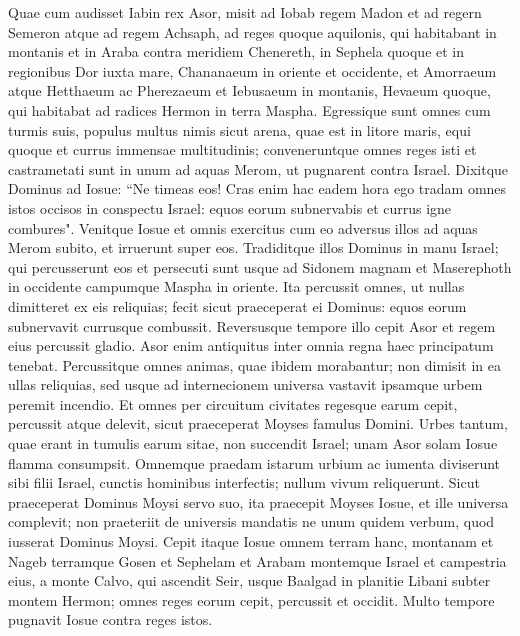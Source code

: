 \begin{biblechapter}  
\verse Quae cum audisset Iabin rex Asor, misit ad Iobab regem Madon et ad regern Semeron atque ad regem Achsaph, 
\verse ad reges quoque aquilonis, qui habitabant in montanis et in Araba contra meridiem Chenereth, in Sephela quoque et in regionibus Dor iuxta mare, 
\verse Chananaeum in oriente et occidente, et Amorraeum atque Hetthaeum ac Pherezaeum et Iebusaeum in montanis, Hevaeum quoque, qui habitabat ad radices Hermon in terra Maspha. 
\verse Egressique sunt omnes cum turmis suis, populus multus nimis sicut arena, quae est in litore maris, equi quoque et currus immensae multitudinis; 
\verse conveneruntque omnes reges isti et castrametati sunt in unum ad aquas Merom, ut pugnarent contra Israel. 
\verse Dixitque Dominus ad Iosue: “Ne timeas eos! Cras enim hac eadem hora ego tradam omnes istos occisos in conspectu Israel: equos eorum subnervabis et currus igne combures". 
\verse Venitque Iosue et omnis exercitus cum eo adversus illos ad aquas Merom subito, et irruerunt super eos. 
\verse Tradiditque illos Dominus in manu Israel; qui percusserunt eos et persecuti sunt usque ad Sidonem magnam et Maserephoth in occidente campumque Maspha in oriente. Ita percussit omnes, ut nullas dimitteret ex eis reliquias; 
\verse fecit sicut praeceperat ei Dominus: equos eorum subnervavit currusque combussit. 
\verse Reversusque tempore illo cepit Asor et regem eius percussit gladio. Asor enim antiquitus inter omnia regna haec principatum tenebat. 
\verse Percussitque omnes animas, quae ibidem morabantur; non dimisit in ea ullas reliquias, sed usque ad internecionem universa vastavit ipsamque urbem peremit incendio. 
\verse Et omnes per circuitum civitates regesque earum cepit, percussit atque delevit, sicut praeceperat Moyses famulus Domini. 
\verse Urbes tantum, quae erant in tumulis earum sitae, non succendit Israel; unam Asor solam Iosue flamma consumpsit.  
\verse Omnemque praedam istarum urbium ac iumenta diviserunt sibi filii Israel, cunctis hominibus interfectis; nullum vivum reliquerunt. 
\verse Sicut praeceperat Dominus Moysi servo suo, ita praecepit Moyses Iosue, et ille universa complevit; non praeteriit de universis mandatis ne unum quidem verbum, quod iusserat Dominus Moysi. 
\verse Cepit itaque Iosue omnem terram hanc, montanam et Nageb terramque Gosen et Sephelam et Arabam montemque Israel et campestria eius, 
\verse a monte Calvo, qui ascendit Seir, usque Baalgad in planitie Libani subter montem Hermon; omnes reges eorum cepit, percussit et occidit. 
\verse Multo tempore pugnavit Iosue contra reges istos. 

\end{biblechapter}
